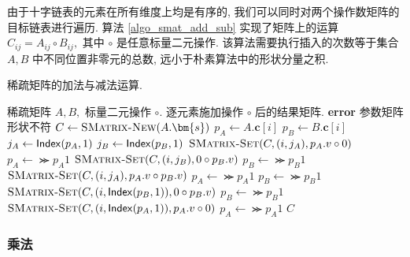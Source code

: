 由于十字链表的元素在所有维度上均是有序的, 我们可以同时对两个操作数矩阵的目标链表进行遍历. 算法 \ref{algo_smat_add_sub} 实现了矩阵上的运算 $C_{ij} = A_{ij} \circ B_{ij},$ 其中 $\circ$ 是任意标量二元操作. 该算法需要执行插入的次数等于集合 $A, B$ 中不同位置非零元的总数, 远小于朴素算法中的形状分量之积.
\begin{breakablealgorithm}
\caption{稀疏矩阵的加法与减法运算.}
\label{algo_smat_add_sub}
\begin{algorithmic}[1]
\Require 稀疏矩阵 $A, B,$ 标量二元操作 $\circ.$
\Ensure 逐元素施加操作 $\circ$ 后的结果矩阵.
        \State \textbf{error} 参数矩阵形状不符
    \EndIf
    \State $C \gets \textsc{SMatrix-New}(A.\bm{s})$
        \State $p_A \gets A.\bm{c}[i]$
        \State $p_B \gets B.\bm{c}[i]$
                \State $j_A \gets \mathsf{Index}(p_A, 1)$
                \State $j_B \gets \mathsf{Index}(p_B, 1)$
                    \State $\textsc{SMatrix-Set}(C, (i, j_A), p_A.v \circ 0)$
                    \State $p_A \gets \Succ{p_A}{1}$
                    \State $\textsc{SMatrix-Set}(C, (i, j_B), 0 \circ p_B.v)$
                    \State $p_B \gets \Succ{p_B}{1}$
                \Else
                    \State $\textsc{SMatrix-Set}(C, (i, j_A), p_A.v \circ p_B.v)$
                    \State $p_A \gets \Succ{p_A}{1}$
                    \State $p_B \gets \Succ{p_B}{1}$
                \EndIf
                \State $\textsc{SMatrix-Set}(C, (i, \mathsf{Index}(p_B, 1)), 0 \circ p_B.v)$
                \State $p_B \gets \Succ{p_B}{1}$
            \Else
                \State $\textsc{SMatrix-Set}(C, (i, \mathsf{Index}(p_A, 1)), p_A.v \circ 0)$
                \State $p_A \gets \Succ{p_A}{1}$
            \EndIf
        \EndWhile
    \EndFor
    \State \Return $C$
\EndFunction
\end{algorithmic}
\end{breakablealgorithm}

\subsubsection{乘法}

